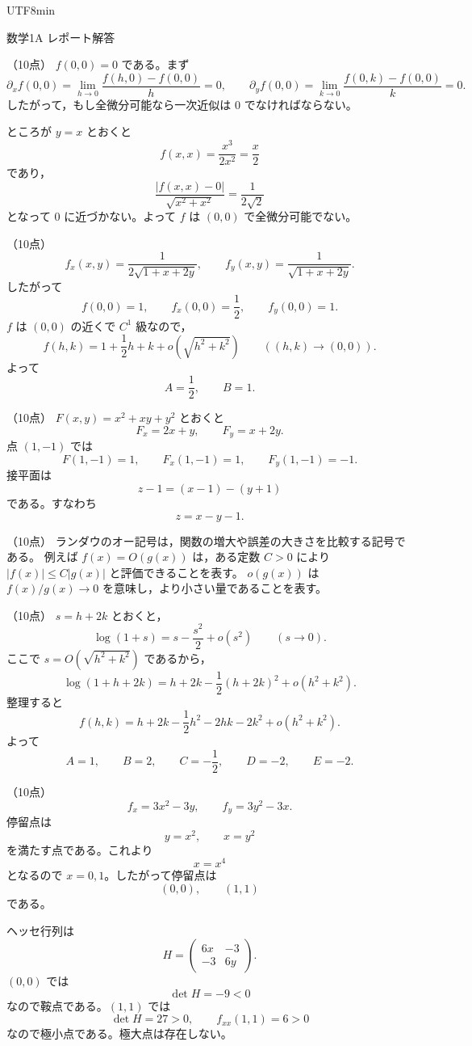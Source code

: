 \documentclass[a4paper,12pt]{article}
\newcommand{\problem}[2][10]{\par\vspace{0.85em}\noindent{\large 問題 #2}\quad（#1点）\quad\ignorespaces}
\begin{document}
\ifPDFTeX
\begin{CJK}{UTF8}{min}
\fi

\begin{center}
{\Large 数学1A レポート解答}
\end{center}

\problem{1}
$f(0,0)=0$ である。まず
\[
\partial_x f(0,0)
=\lim_{h\to 0}\frac{f(h,0)-f(0,0)}{h}=0,
\qquad
\partial_y f(0,0)
=\lim_{k\to 0}\frac{f(0,k)-f(0,0)}{k}=0.
\]
したがって，もし全微分可能なら一次近似は $0$ でなければならない。

ところが $y=x$ とおくと
\[
f(x,x)=\frac{x^3}{2x^2}=\frac{x}{2}
\]
であり，
\[
\frac{|f(x,x)-0|}{\sqrt{x^2+x^2}}
=\frac{1}{2\sqrt{2}}
\]
となって $0$ に近づかない。よって $f$ は $(0,0)$ で全微分可能でない。

\problem{2}
\[
f_x(x,y)=\frac{1}{2\sqrt{1+x+2y}},
\qquad
f_y(x,y)=\frac{1}{\sqrt{1+x+2y}}.
\]
したがって
\[
f(0,0)=1,\qquad f_x(0,0)=\frac12,\qquad f_y(0,0)=1.
\]
$f$ は $(0,0)$ の近くで $C^1$ 級なので，
\[
f(h,k)=1+\frac12h+k+o\left(\sqrt{h^2+k^2}\right)
\qquad ((h,k)\to(0,0)).
\]
よって
\[
A=\frac12,\qquad B=1.
\]

\problem{3}
$F(x,y)=x^2+xy+y^2$ とおくと
\[
F_x=2x+y,\qquad F_y=x+2y.
\]
点 $(1,-1)$ では
\[
F(1,-1)=1,\qquad F_x(1,-1)=1,\qquad F_y(1,-1)=-1.
\]
接平面は
\[
z-1=(x-1)-(y+1)
\]
である。すなわち
\[
z=x-y-1.
\]

\problem{4}
ランダウのオー記号は，関数の増大や誤差の大きさを比較する記号である。
例えば $f(x)=O(g(x))$ は，ある定数 $C>0$ により
$|f(x)|\le C|g(x)|$ と評価できることを表す。
$o(g(x))$ は $f(x)/g(x)\to 0$ を意味し，より小さい量であることを表す。

\problem{5}
$s=h+2k$ とおくと，
\[
\log(1+s)=s-\frac{s^2}{2}+o(s^2)
\qquad (s\to 0).
\]
ここで $s=O(\sqrt{h^2+k^2})$ であるから，
\[
\log(1+h+2k)
=h+2k-\frac12(h+2k)^2+o(h^2+k^2).
\]
整理すると
\[
f(h,k)
=h+2k-\frac12h^2-2hk-2k^2+o(h^2+k^2).
\]
よって
\[
A=1,\qquad B=2,\qquad C=-\frac12,\qquad D=-2,\qquad E=-2.
\]

\problem{6}
\[
f_x=3x^2-3y,\qquad f_y=3y^2-3x.
\]
停留点は
\[
y=x^2,\qquad x=y^2
\]
を満たす点である。これより
\[
x=x^4
\]
となるので $x=0,1$。したがって停留点は
\[
(0,0),\qquad (1,1)
\]
である。

ヘッセ行列は
\[
H=
\begin{pmatrix}
6x & -3\\
-3 & 6y
\end{pmatrix}.
\]
$(0,0)$ では
\[
\det H=-9<0
\]
なので鞍点である。$(1,1)$ では
\[
\det H=27>0,\qquad f_{xx}(1,1)=6>0
\]
なので極小点である。極大点は存在しない。


\end{CJK}
\end{document}
